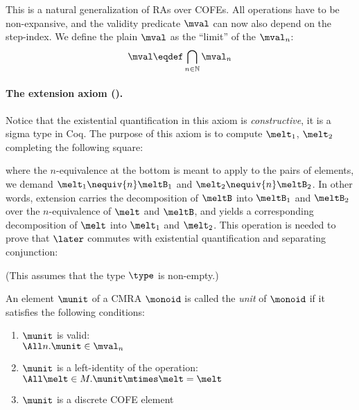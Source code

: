 This is a natural generalization of RAs over COFEs.
All operations have to be non-expansive, and the validity predicate $\mval$ can now also depend on the step-index.
We define the plain $\mval$ as the ``limit'' of the $\mval_n$:
\[ \mval \eqdef \bigcap_{n \in \mathbb{N}} \mval_n \]

\paragraph{The extension axiom ().}
Notice that the existential quantification in this axiom is \emph{constructive}, \ie it is a sigma type in Coq.
The purpose of this axiom is to compute $\melt_1$, $\melt_2$ completing the following square:

\begin{center}
\end{center}
where the $n$-equivalence at the bottom is meant to apply to the pairs of elements, \ie we demand $\melt_1 \nequiv{n} \meltB_1$ and $\melt_2 \nequiv{n} \meltB_2$.
In other words, extension carries the decomposition of $\meltB$ into $\meltB_1$ and $\meltB_2$ over the $n$-equivalence of $\melt$ and $\meltB$, and yields a corresponding decomposition of $\melt$ into $\melt_1$ and $\melt_2$.
This operation is needed to prove that $\later$ commutes with existential quantification and separating conjunction:
(This assumes that the type $\type$ is non-empty.)

\begin{defn}
  An element $\munit$ of a CMRA $\monoid$ is called the \emph{unit} of $\monoid$ if it satisfies the following conditions:
  \begin{enumerate}[itemsep=0pt]
  \item $\munit$ is valid: \\ $\All n. \munit \in \mval_n$
  \item $\munit$ is a left-identity of the operation: \\
    $\All \melt \in M. \munit \mtimes \melt = \melt$
  \item $\munit$ is a discrete COFE element
  \end{enumerate}
\end{defn}

